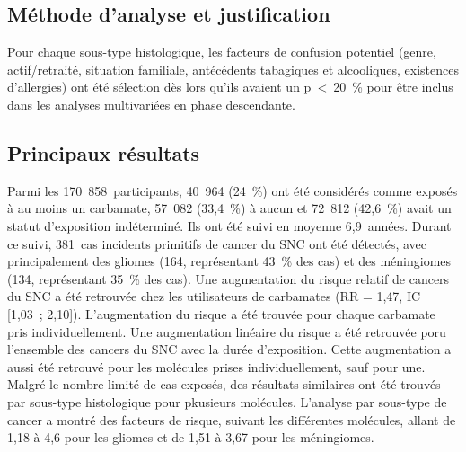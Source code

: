 \documentclass[10pt]{article}
\begin{document}
\subsection{Méthode d'analyse et justification}
Pour chaque sous-type histologique, les facteurs de confusion potentiel (genre, actif/retraité, situation familiale, antécédents tabagiques et alcooliques, existences d'allergies) ont été sélection dès lors qu'ils avaient un p~<~20~\% pour être inclus dans les analyses multivariées en phase descendante. 

\subsection{Principaux résultats}
Parmi les 170~858~participants, 40~964 (24~\%) ont été considérés comme exposés à au moins un carbamate, 57~082 (33,4~\%) à aucun et 72~812 (42,6~\%) avait un statut d'exposition indéterminé. Ils ont été suivi en moyenne 6,9~années. Durant ce suivi, 381~cas incidents primitifs de cancer du SNC ont été détectés, avec principalement des gliomes (164, représentant 43~\% des cas) et des méningiomes (134, représentant 35~\% des cas). Une augmentation du risque relatif de cancers du SNC a été retrouvée chez les utilisateurs de carbamates (RR = 1,47, IC [1,03~; 2,10]). L'augmentation du risque a été trouvée pour chaque carbamate pris individuellement. Une augmentation linéaire du risque a été retrouvée poru l'ensemble des cancers du SNC avec la durée d'exposition. Cette augmentation a aussi été retrouvé pour les molécules prises individuellement, sauf pour une. Malgré le nombre limité de cas exposés, des résultats similaires ont été trouvés par sous-type histologique pour pkusieurs molécules. L'analyse par sous-type de cancer a montré des facteurs de risque, suivant les différentes molécules, allant de 1,18 à 4,6 pour les gliomes et de 1,51 à 3,67 pour les méningiomes.
\end{document}
